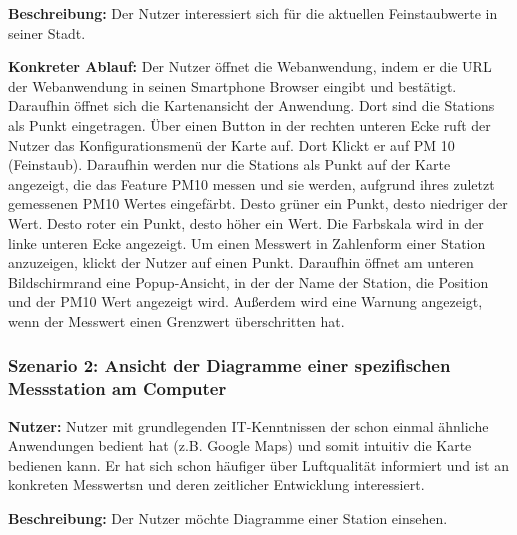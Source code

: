 \textbf{Beschreibung:} Der Nutzer interessiert sich für die aktuellen Feinstaubwerte in seiner Stadt.

\textbf{Konkreter Ablauf:}
Der Nutzer öffnet die \gls{Webanwendung}, indem er die URL der \gls{Webanwendung} in seinen Smartphone Browser eingibt und bestätigt. Daraufhin öffnet 
sich die Kartenansicht der Anwendung. Dort sind die \glspl{Station} als Punkt eingetragen. Über einen Button in der rechten unteren 
Ecke ruft der Nutzer das Konfigurationsmenü der Karte auf. Dort Klickt er auf PM 10 (Feinstaub). Daraufhin werden nur die 
\glspl{Station} als Punkt auf der Karte angezeigt, die das \gls{Feature} PM10 messen und sie werden, aufgrund ihres zuletzt 
gemessenen PM10 Wertes eingefärbt. Desto grüner ein Punkt, desto niedriger der Wert. Desto roter ein Punkt, desto höher ein Wert. 
Die Farbskala wird in der linke unteren Ecke angezeigt.
Um einen \gls{Messwert} in Zahlenform einer \gls{Station} anzuzeigen, klickt der Nutzer auf einen Punkt. Daraufhin öffnet am 
unteren Bildschirmrand eine Popup-Ansicht, in der der Name der \gls{Station}, die Position und der PM10 Wert angezeigt wird. 
Außerdem wird eine Warnung angezeigt, wenn der \gls{Messwert} einen Grenzwert überschritten hat.
\newpage

\subsubsection*{Szenario 2: Ansicht der Diagramme einer spezifischen Messstation am Computer}
\textbf{Nutzer:} Nutzer mit grundlegenden IT-Kenntnissen der schon einmal ähnliche Anwendungen bedient hat (z.B. Google Maps) 
und somit intuitiv die Karte bedienen kann. Er hat sich schon häufiger über Luftqualität informiert und ist an konkreten 
\glspl{Messwert}n und deren zeitlicher Entwicklung interessiert.

\textbf{Beschreibung:} Der Nutzer möchte Diagramme einer \gls{Station} einsehen.

